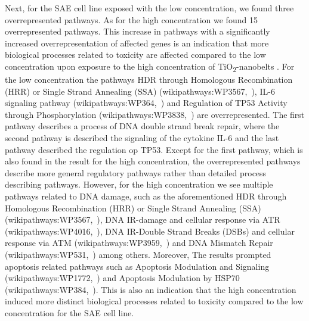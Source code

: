 \documentclass[ijms,article,submit,moreauthors,pdftex]{Definitions/mdpi}
\begin{document}
Next, for the SAE cell line exposed with the low concentration, we found three overrepresented pathways. As for the high concentration we found 15 overrepresented pathways. This increase in pathways with a significantly increased overrepresentation of affected genes is an indication that more biological processes related to toxicity are affected compared to the low concentration upon exposure to the high concentration of TiO\textsubscript{2}-nanobelts . For the low concentration the pathways HDR through Homologous Recombination (HRR) or Single Strand Annealing (SSA) (wikipathways:WP3567,~\cite{WP3567}), IL-6 signaling pathway (wikipathways:WP364,~\cite{WP364}) and Regulation of TP53 Activity through Phosphorylation (wikipathways:WP3838,~\cite{WP3838}) are overrepresented. The first pathway describes a process of DNA double strand break repair, where the second pathway is described the signaling of the cytokine IL-6 and the last pathway described the regulation op TP53. Except for the first pathway, which is also found in the result for the high concentration, the overrepresented pathways describe more general regulatory pathways rather than detailed process describing pathways. However, for the high concentration we see multiple pathways related to DNA damage, such as the aforementioned HDR through Homologous Recombination (HRR) or Single Strand Annealing (SSA) (wikipathways:WP3567,~\cite{WP3567}), DNA IR-damage and cellular response via ATR (wikipathways:WP4016,~\cite{WP4016}), DNA IR-Double Strand Breaks (DSBs) and cellular response via ATM (wikipathways:WP3959,~\cite{WP3959}) and DNA Mismatch Repair (wikipathways:WP531,~\cite{WP531}) among others. Moreover, The results prompted apoptosis related pathways such as Apoptosis Modulation and Signaling (wikipathways:WP1772,~\cite{WP1772}) and Apoptosis Modulation by HSP70 (wikipathways:WP384,~\cite{WP384}). This is also an indication that the high concentration induced more distinct biological processes related to toxicity compared to the low concentration for the SAE cell line. 
\end{document}
